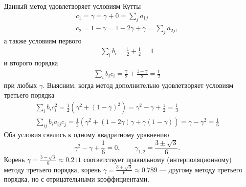 \documentclass[12pt]{article}
\begin{document}
Данный метод удовлетворяет условиям Кутты
\begin{gather*}
	c_1 = \gamma = \gamma + 0 = \sum_j a_{1j}\\
	c_2 = 1 - \gamma = 1 - 2\gamma + \gamma = \sum_j a_{2j},
\end{gather*}
а также условиям первого
\begin{gather*}
	\sum_i b_i = \frac{1}{2} + \frac{1}{2} = 1
\end{gather*}
и второго порядка
\begin{gather*}
\sum_i b_i c_i = \frac{\gamma}{2} + \frac{1-\gamma}{2} = \frac{1}{2}
\end{gather*}
при любых $\gamma$. Выясним, когда метод дополнительно удовлетворяет условиям третьего порядка
\begin{gather*}
	\sum_{i} b_i c_i^2 = \frac{1}{2}\left(\gamma^2 + (1-\gamma)^2\right) 
	= \gamma^2 - \gamma + \frac{1}{2} = \frac{1}{3}\\
	\sum_{ij} b_i a_{ij} c_j = \frac{1}{2}\left(\gamma^2 + (1-2\gamma)\gamma + \gamma(1-\gamma)\right) = \gamma - \gamma^2 = \frac{1}{6}	
\end{gather*}
Оба условия свелись к одному квадратному уравнению
\[
\gamma^2 - \gamma + \frac{1}{6} = 0, \qquad \gamma_{1,2} = \frac{3 \pm \sqrt{3}}{6}.
\]
Корень $\gamma = \frac{3-\sqrt{3}}{6} \approx 0.211$ соответствует правильному (интерполяционному) методу третьего порядка, корень $\gamma = \frac{3+\sqrt{3}}{6} \approx 0.789$ --- другому методу третьего порядка, но с отрицательными коэффициентами.
\end{document}
